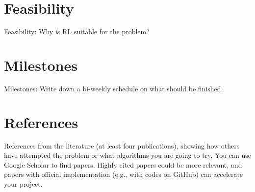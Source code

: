 \documentclass[12pt]{article}
\begin{document}
\section{Feasibility}
Feasibility: Why is RL suitable for the problem?

\section{Milestones}
Milestones: Write down a bi-weekly schedule on what should be finished.

\vspace{0.5em}
\newpage 

\section{References}
References from the literature (at least four publications), showing how others have attempted the problem or what algorithms you are going to try. You can use Google Scholar to find papers. Highly cited papers could be more relevant, and papers with official implementation (e.g., with codes on GitHub) can accelerate your project.
\end{document}
